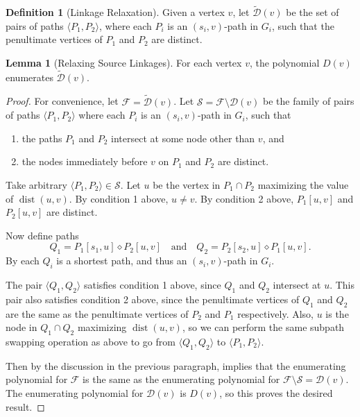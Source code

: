 \documentclass[11pt]{article}
\newcommand{\dia}{\diamond}
\DeclareMathOperator{\dist}{dist}
\newcommand{\ca}{\mathcal}
\theoremstyle{definition}
\newtheorem{lemma}[theorem]{Lemma}
\newtheorem{definition}[theorem]{Definition}
\begin{document}
\begin{definition}[Linkage Relaxation]
    Given a vertex $v$, let $\tilde{\ca{D}}(v)$ be the set of pairs of paths $\langle P_1,P_2\rangle$, where each $P_i$ is an $(s_i,v)$-path in $G_i$, such that the penultimate vertices of $P_1$ and $P_2$ are distinct.
\end{definition}

\begin{lemma}[Relaxing Source Linkages]
    \label{linkage-relaxation}
    For each vertex $v$, the polynomial $D(v)$ enumerates $\tilde{\ca{D}}(v)$.
\end{lemma}
        \begin{proof}
            For convenience, let $\ca{F} = \tilde{\ca{D}}(v)$.
            Let $\ca{S} = \ca{F}\setminus\ca{D}(v)$ be the family of pairs of paths $\langle P_1,P_2\rangle$ where each $P_i$ is an $(s_i,v)$-path in $G_i$, such that 
            \begin{enumerate}
                \item the paths $P_1$ and $P_2$ intersect at some node other than $v$, and 
                \item the nodes immediately before $v$ on $P_1$ and $P_2$ are distinct.
            \end{enumerate}
            Take arbitrary $\langle P_1,P_2\rangle\in\ca{S}$.
            Let $u$ be the vertex in $P_1\cap P_2$ maximizing the value of $\dist(u,v)$.
            By condition 1 above, $u\neq v$.
            By condition 2 above, $P_1[u,v]$ and $P_2[u,v]$ are distinct.
        
                Now define paths 
                \[Q_1 = P_1[s_1,u]\dia P_2[u,v] \quad
                \text{and}
                \quad
                Q_2 = P_2[s_2,u]\dia P_1[u,v].\]
            By  each $Q_i$ is a shortest path, and thus an $(s_i,v)$-path in $G_i$.
        
            The pair $\langle Q_1,Q_2\rangle$ satisfies condition 1 above, since $Q_1$ and $Q_2$ intersect at $u$.
            This pair also satisfies condition 2 above, since the penultimate vertices of $Q_1$ and $Q_2$ are the same as the penultimate vertices of $P_2$ and $P_1$ respectively.
            Also, $u$ is the node in $Q_1\cap Q_2$ maximizing $\dist(u,v)$, so we can perform the same subpath swapping operation as above to go from $\langle Q_1, Q_2\rangle$ to $\langle P_1, P_2\rangle$.
        
            Then by the discussion in the previous paragraph,  implies that the enumerating polynomial for $\ca{F}$ is the same as the enumerating polynomial for $\ca{F}\setminus\ca{S} = \ca{D}(v)$.
           The enumerating polynomial for $\ca{D}(v)$ is $D(v)$, so this proves the desired result.
        \end{proof}
\end{document}
